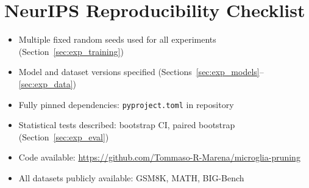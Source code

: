 \documentclass{article}
\begin{document}
\section{NeurIPS Reproducibility Checklist}
\label{app:reproducibility}

\begin{itemize}
  \item[$\checkmark$] Multiple fixed random seeds used for all experiments
        (Section~\ref{sec:exp_training})
  \item[$\checkmark$] Model and dataset versions specified
        (Sections~\ref{sec:exp_models}--\ref{sec:exp_data})
  \item[$\checkmark$] Fully pinned dependencies: \texttt{pyproject.toml} in repository
  \item[$\checkmark$] Statistical tests described: bootstrap CI, paired bootstrap
        (Section~\ref{sec:exp_eval})
  \item[$\checkmark$] Code available:
        \url{https://github.com/Tommaso-R-Marena/microglia-pruning}
  \item[$\checkmark$] All datasets publicly available: GSM8K, MATH, BIG-Bench
\end{itemize}
\end{document}
